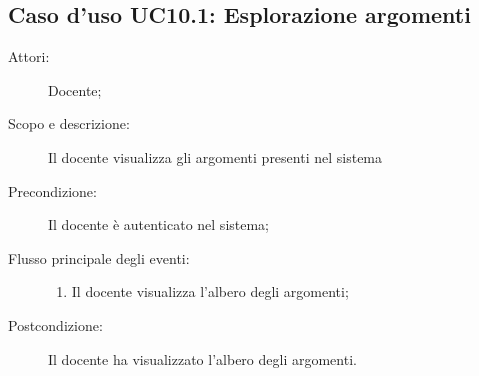 \subsection{Caso d'uso UC10.1: Esplorazione argomenti}\begin{description}
\item[Attori:] Docente;
\item[Scopo e descrizione:] Il docente visualizza gli argomenti presenti nel sistema
      \item[Precondizione:] Il docente è autenticato nel sistema;

        \item[Flusso principale degli eventi:] \begin{enumerate}
          \item Il docente visualizza l'albero degli argomenti;

      \end{enumerate}
    \item[Postcondizione:] Il docente ha visualizzato l'albero degli argomenti.
  \end{description}
\hypertarget{UC10.2}{}

